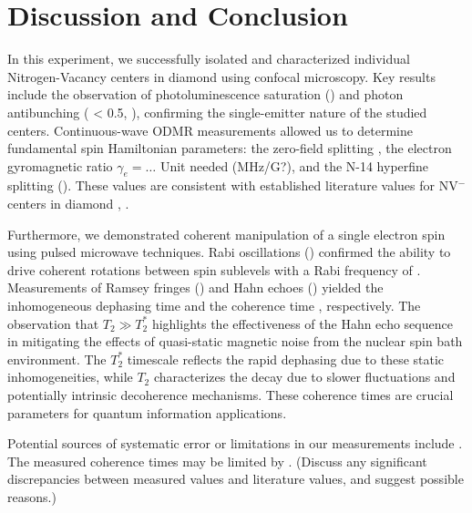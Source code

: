 \documentclass[aps,prb,twocolumn,superscriptaddress,floatfix,longbibliography,citeautoscript]{revtex4-2}
\begin{document}
\section{\label{sec:discussion_conclusion}Discussion and Conclusion} %
In this experiment, we successfully isolated and characterized individual Nitrogen-Vacancy centers in diamond using confocal microscopy.
Key results include the observation of photoluminescence saturation () and photon antibunching ( < 0.5, ), confirming the single-emitter nature of the studied centers.
Continuous-wave ODMR measurements allowed us to determine fundamental spin Hamiltonian parameters: the zero-field splitting , 
the electron gyromagnetic ratio $\gamma_e = \dots$ Unit needed (MHz/G?),
and the N-14 hyperfine splitting  ().
These values are consistent with established literature values for NV$^-$ centers in diamond , . 

Furthermore, we demonstrated coherent manipulation of a single electron spin using pulsed microwave techniques.
Rabi oscillations () confirmed the ability to drive coherent rotations between spin sublevels with a Rabi frequency of .
Measurements of Ramsey fringes () and Hahn echoes () yielded the inhomogeneous dephasing time  and the coherence time , respectively.
The observation that $T_2 \gg T_2^*$ highlights the effectiveness of the Hahn echo sequence in mitigating the effects of quasi-static magnetic noise from the nuclear spin bath environment.
The $T_2^*$ timescale reflects the rapid dephasing due to these static inhomogeneities, while $T_2$ characterizes the decay due to slower fluctuations and potentially intrinsic decoherence mechanisms.
These coherence times are crucial parameters for quantum information applications.

Potential sources of systematic error or limitations in our measurements include .
The measured coherence times  may be limited by .
(Discuss any significant discrepancies between measured values and literature values, and suggest possible reasons.)
\end{document}
